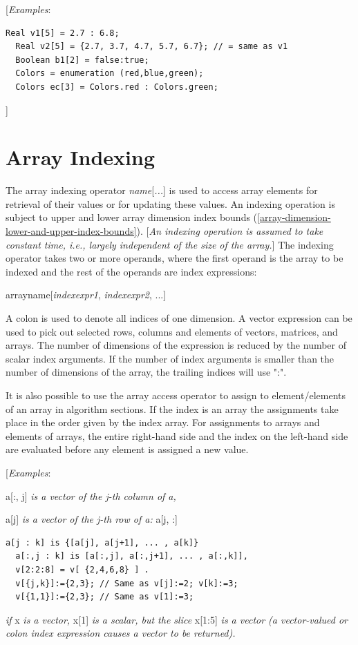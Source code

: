 \documentclass[10pt,a4paper]{report}
\def\doublelabel#1{\label{#1}}
\begin{document}
{[}\emph{Examples}:

\begin{lstlisting}[language=modelica]
  Real v1[5] = 2.7 : 6.8;
  Real v2[5] = {2.7, 3.7, 4.7, 5.7, 6.7}; // = same as v1
  Boolean b1[2] = false:true;
  Colors = enumeration (red,blue,green);
  Colors ec[3] = Colors.red : Colors.green;
\end{lstlisting}
{]}

\section{Array Indexing}\doublelabel{array-indexing}

The array indexing operator \emph{name}{[}\emph{...}{]} is used to
access array elements for retrieval of their values or for updating
these values. An indexing operation is subject to upper and lower array
dimension index bounds (\ref{array-dimension-lower-and-upper-index-bounds}). {[}\emph{An indexing operation
is assumed to take constant time, i.e., largely independent of the size
of the array.}{]} The indexing operator takes two or more operands,
where the first operand is the array to be indexed and the rest of the
operands are index expressions:

arrayname{[}\emph{indexexpr1}, \emph{indexexpr2}, ...{]}

A colon is used to denote all indices of one dimension. A vector
expression can be used to pick out selected rows, columns and elements
of vectors, matrices, and arrays. The number of dimensions of the
expression is reduced by the number of scalar index arguments. If the
number of index arguments is smaller than the number of dimensions of
the array, the trailing indices will use ":".

It is also possible to use the array access operator to assign to
element/elements of an array in algorithm sections. If the index is an
array the assignments take place in the order given by the index array.
For assignments to arrays and elements of arrays, the entire right-hand
side and the index on the left-hand side are evaluated before any
element is assigned a new value.

{[}\emph{Examples}:

a{[}:, j{]} \emph{is a vector of the j-th column of a,}

a{[}j{]} \emph{is a vector of the j-th row of a:} a{[}j, :{]}

\begin{lstlisting}[language=modelica]
  a[j : k] is {[a[j], a[j+1], ... , a[k]}
  a[:,j : k] is [a[:,j], a[:,j+1], ... , a[:,k]],
  v[2:2:8] = v[ {2,4,6,8} ] .
  v[{j,k}]:={2,3}; // Same as v[j]:=2; v[k]:=3;
  v[{1,1}]:={2,3}; // Same as v[1]:=3;
\end{lstlisting}
\emph{if} x \emph{is a vector,} x{[}1{]} \emph{is a scalar, but the
slice} x{[}1:5{]} \emph{is a vector (a vector-valued or colon index
expression causes a vector to be returned).}
\end{document}
